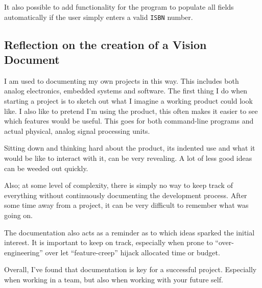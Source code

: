 It also possible to add functionality for the program to populate all fields
automatically if the user simply enters a valid \texttt{ISBN} number.


\subsection{Reflection on the creation of a Vision Document}\label{task-2-reflect}
I am used to documenting my own projects in this way. This includes both analog electronics,
embedded systems and software. The first thing I do when starting a project is to
sketch out what I imagine a working product could look like. I also like to pretend I'm using
the product, this often makes it easier to see which features would be useful. This goes
for both command-line programs and actual physical, analog signal processing units.

Sitting down and thinking hard about the product, its indented use and what it
would be like to interact with it, can be very revealing. A lot of less good
ideas can be weeded out quickly.

Also; at some level of complexity, there is simply no way to keep track of
everything without continuously documenting the development process.  After
some time away from a project, it can be very difficult to remember what was
going on.

The documentation also acts as a reminder as to which ideas sparked the initial
interest.  It is important to keep on track, especially when prone to
``over-engineering''\cite{wiki:overengineering} over let
``feature-creep''\cite{wiki:overengineering} hijack allocated time or budget.

Overall, I've found that documentation is key for a successful project.
Especially when working in a team, but also when working with your future self.

